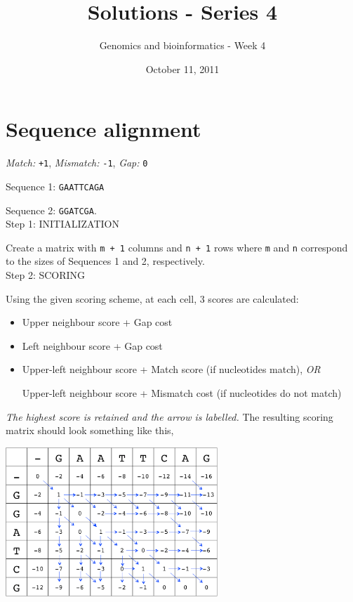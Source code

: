 \documentclass[english, a4paper,11pt]{article}
\title{Solutions - Series 4}
\date{October 11, 2011}
\author{Genomics and bioinformatics - Week 4}
\begin{document}
\maketitle

\section{Sequence alignment}

\emph{Match:}  \texttt{+1}, \emph{Mismatch:} \texttt{-1}, \emph{Gap:} \texttt{0}

Sequence 1: \texttt{GAATTCAGA}

Sequence 2: \texttt{GGATCGA}.\\

Step 1: INITIALIZATION

Create a matrix with \texttt{m + 1} columns and \texttt{n + 1} rows where \texttt{m} and \texttt{n} correspond to the sizes of Sequences 1 and 2, respectively. \\


Step 2: SCORING

Using the given scoring scheme, at each cell, 3 scores are calculated:
\begin{itemize}
\item Upper neighbour score + Gap cost
\item Left neighbour score + Gap cost
\item Upper-left neighbour score + Match score (if nucleotides match), \emph{OR} 

Upper-left neighbour score + Mismatch cost (if nucleotides do not match)
\end{itemize}

\indent\emph{The highest score is retained and the arrow is labelled.} The resulting scoring matrix should look something like this, \\

\begin{center}
\includegraphics[width=0.6\textwidth]{scoring.png}\\
\end{center}
\end{document}
